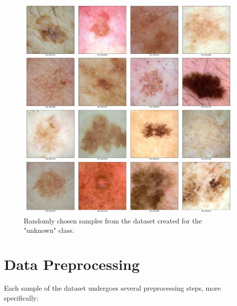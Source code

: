     \begin{figure}[h!]
        \centering
        \includegraphics[width=\textwidth]{figs/unknown_image_samples.pdf}
        \caption{Randomly chosen samples from the dataset created for the "unknown" class.}
        \label{fig:unknown_samples}
    \end{figure}


\section{Data Preprocessing}
\label{section:preprocessing}
    Each sample of the dataset undergoes several preprocessing steps, more specifically:
    
